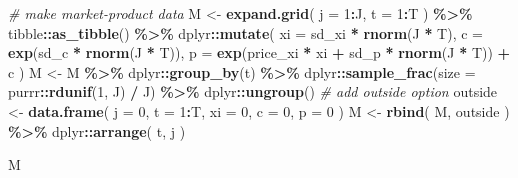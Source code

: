 \documentclass[
]{book}
\newenvironment{Shaded}{\begin{snugshade}}{\end{snugshade}}
\newcommand{\AttributeTok}[1]{\textcolor[rgb]{0.13,0.29,0.53}{#1}}
\newcommand{\CommentTok}[1]{\textcolor[rgb]{0.56,0.35,0.01}{\textit{#1}}}
\newcommand{\DecValTok}[1]{\textcolor[rgb]{0.00,0.00,0.81}{#1}}
\newcommand{\FunctionTok}[1]{\textcolor[rgb]{0.13,0.29,0.53}{\textbf{#1}}}
\newcommand{\NormalTok}[1]{#1}
\newcommand{\OtherTok}[1]{\textcolor[rgb]{0.56,0.35,0.01}{#1}}
\newcommand{\SpecialCharTok}[1]{\textcolor[rgb]{0.81,0.36,0.00}{\textbf{#1}}}
\begin{document}
\begin{Shaded}
\begin{Highlighting}[]
\CommentTok{\# make market{-}product data}
\NormalTok{M }\OtherTok{\textless{}{-}} 
  \FunctionTok{expand.grid}\NormalTok{(}
    \AttributeTok{j =} \DecValTok{1}\SpecialCharTok{:}\NormalTok{J, }
    \AttributeTok{t =} \DecValTok{1}\SpecialCharTok{:}\NormalTok{T}
\NormalTok{    ) }\SpecialCharTok{\%\textgreater{}\%}
\NormalTok{    tibble}\SpecialCharTok{::}\FunctionTok{as\_tibble}\NormalTok{() }\SpecialCharTok{\%\textgreater{}\%}
\NormalTok{    dplyr}\SpecialCharTok{::}\FunctionTok{mutate}\NormalTok{(}
      \AttributeTok{xi =}\NormalTok{ sd\_xi }\SpecialCharTok{*} \FunctionTok{rnorm}\NormalTok{(J }\SpecialCharTok{*}\NormalTok{ T),}
      \AttributeTok{c =} \FunctionTok{exp}\NormalTok{(sd\_c }\SpecialCharTok{*} \FunctionTok{rnorm}\NormalTok{(J }\SpecialCharTok{*}\NormalTok{ T)),}
      \AttributeTok{p =} \FunctionTok{exp}\NormalTok{(price\_xi }\SpecialCharTok{*}\NormalTok{ xi }\SpecialCharTok{+}\NormalTok{ sd\_p }\SpecialCharTok{*} \FunctionTok{rnorm}\NormalTok{(J }\SpecialCharTok{*}\NormalTok{ T)) }\SpecialCharTok{+}\NormalTok{ c}
\NormalTok{    ) }
\NormalTok{M }\OtherTok{\textless{}{-}} 
\NormalTok{  M }\SpecialCharTok{\%\textgreater{}\%}
\NormalTok{  dplyr}\SpecialCharTok{::}\FunctionTok{group\_by}\NormalTok{(t) }\SpecialCharTok{\%\textgreater{}\%}
\NormalTok{  dplyr}\SpecialCharTok{::}\FunctionTok{sample\_frac}\NormalTok{(}\AttributeTok{size =}\NormalTok{ purrr}\SpecialCharTok{::}\FunctionTok{rdunif}\NormalTok{(}\DecValTok{1}\NormalTok{, J) }\SpecialCharTok{/}\NormalTok{ J) }\SpecialCharTok{\%\textgreater{}\%}
\NormalTok{  dplyr}\SpecialCharTok{::}\FunctionTok{ungroup}\NormalTok{()}
\CommentTok{\# add outside option}
\NormalTok{outside }\OtherTok{\textless{}{-}} 
  \FunctionTok{data.frame}\NormalTok{(}
    \AttributeTok{j =} \DecValTok{0}\NormalTok{, }
    \AttributeTok{t =} \DecValTok{1}\SpecialCharTok{:}\NormalTok{T, }
    \AttributeTok{xi =} \DecValTok{0}\NormalTok{, }
    \AttributeTok{c =} \DecValTok{0}\NormalTok{, }
    \AttributeTok{p =} \DecValTok{0}
\NormalTok{    )}
\NormalTok{M }\OtherTok{\textless{}{-}} 
  \FunctionTok{rbind}\NormalTok{(}
\NormalTok{    M,}
\NormalTok{    outside}
\NormalTok{    ) }\SpecialCharTok{\%\textgreater{}\%}
\NormalTok{  dplyr}\SpecialCharTok{::}\FunctionTok{arrange}\NormalTok{(}
\NormalTok{    t, }
\NormalTok{    j}
\NormalTok{    )}
\end{Highlighting}
\end{Shaded}

\begin{Shaded}
\begin{Highlighting}[]
\NormalTok{M}
\end{Highlighting}
\end{Shaded}
\end{document}
